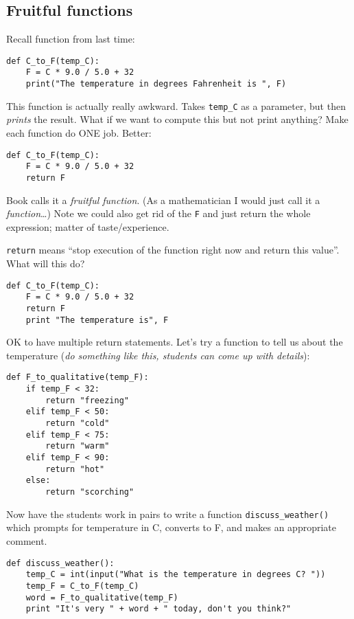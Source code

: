 \documentclass{article}
\begin{document}
\subsection*{Fruitful functions}

Recall function from last time:
\begin{verbatim}
def C_to_F(temp_C):
    F = C * 9.0 / 5.0 + 32
    print("The temperature in degrees Fahrenheit is ", F)
\end{verbatim}
This function is actually really awkward.  Takes \verb|temp_C| as a
parameter, but then \emph{prints} the result.  What if we want to
compute this but not print anything?  Make each function do ONE job.
Better:
\begin{verbatim}
def C_to_F(temp_C):
    F = C * 9.0 / 5.0 + 32
    return F
\end{verbatim}
Book calls it a \emph{fruitful function}.  (As a mathematician I would
just call it a \emph{function}\dots) Note we could also get rid of the
\verb|F| and just return the whole expression; matter of
taste/experience.

\verb|return| means ``stop execution of the function right now and
return this value''.  What will this do?

\begin{verbatim}
def C_to_F(temp_C):
    F = C * 9.0 / 5.0 + 32
    return F
    print "The temperature is", F
\end{verbatim}

OK to have multiple return statements.  Let's try a function to tell
us about the temperature (\emph{do something like this, students can
  come up with details}):
\begin{verbatim}
def F_to_qualitative(temp_F):
    if temp_F < 32:
        return "freezing"
    elif temp_F < 50:
        return "cold"
    elif temp_F < 75:
        return "warm"
    elif temp_F < 90:
        return "hot"
    else:
        return "scorching"
\end{verbatim}

Now have the students work in pairs to write a function
\verb|discuss_weather()| which prompts for temperature in C, converts
to F, and makes an appropriate comment.

\begin{verbatim}
def discuss_weather():
    temp_C = int(input("What is the temperature in degrees C? "))
    temp_F = C_to_F(temp_C)
    word = F_to_qualitative(temp_F)
    print "It's very " + word + " today, don't you think?"
\end{verbatim}
\end{document}
